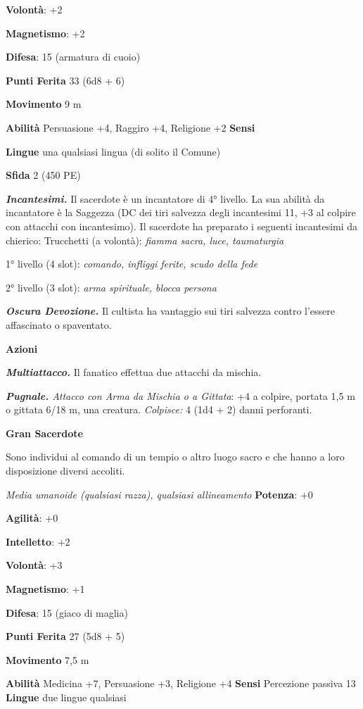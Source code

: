 \begin{multicols}{2}
\textbf{Volontà}: +2

\textbf{Magnetismo}: +2

\textbf{Difesa}: 15 (armatura di cuoio)

\textbf{Punti Ferita} 33 (6d8 + 6)

\textbf{Movimento} 9 m

\textbf{Abilità} Persuasione +4, Raggiro +4, Religione +2 \textbf{Sensi}


\textbf{Lingue} una qualsiasi lingua (di solito il Comune)

\textbf{Sfida} 2 (450 PE)

\emph{\textbf{Incantesimi.}} Il sacerdote è un incantatore di 4°
livello. La sua abilità da incantatore è la Saggezza (DC dei tiri
salvezza degli incantesimi 11, +3 al colpire con attacchi con
incantesimo). Il sacerdote ha preparato i seguenti incantesimi da
chierico: Trucchetti (a volontà): \emph{fiamma sacra, luce, taumaturgia}

1° livello (4 slot): \emph{comando, infliggi ferite, scudo della fede}

2° livello (3 slot): \emph{arma spirituale, blocca persona}

\emph{\textbf{Oscura Devozione.}} Il cultista ha vantaggio sui tiri
salvezza contro l'essere affascinato o spaventato.

\textbf{Azioni}

\emph{\textbf{Multiattacco.}} Il fanatico effettua due attacchi da
mischia.

\emph{\textbf{Pugnale.} Attacco con Arma da Mischia o a Gittata}: +4 a
colpire, portata 1,5 m o gittata 6/18 m, una creatura. \emph{Colpisce:}
4 (1d4 + 2) danni perforanti.

\textbf{Gran Sacerdote}

Sono individui al comando di un tempio o altro luogo sacro e che hanno a
loro disposizione diversi accoliti.

\emph{Media umanoide (qualsiasi razza), qualsiasi allineamento}
\textbf{Potenza}: +0

\textbf{Agilità}: +0

\textbf{Intelletto}: +2

\textbf{Volontà}: +3

\textbf{Magnetismo}: +1

\textbf{Difesa}: 15 (giaco di maglia)

\textbf{Punti Ferita} 27 (5d8 + 5)

\textbf{Movimento} 7,5 m

\textbf{Abilità} Medicina +7, Persuasione +3, Religione +4
\textbf{Sensi} Percezione passiva 13 \textbf{Lingue} due lingue
qualsiasi


\end{multicols}
